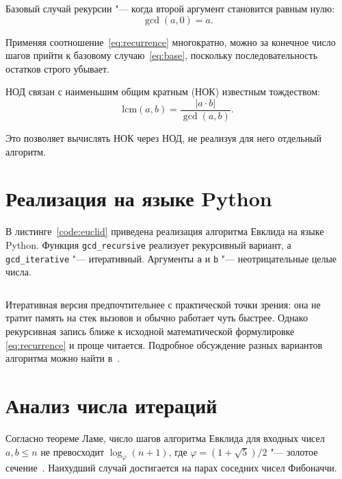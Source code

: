 \documentclass[coursework]{SCWorks}
\begin{document}
Базовый случай рекурсии "--- когда второй аргумент становится равным нулю:
\begin{equation}\label{eq:base}
    \gcd(a, 0) = a.
\end{equation}

Применяя соотношение~\eqref{eq:recurrence} многократно, можно за конечное
число шагов прийти к базовому случаю~\eqref{eq:base}, поскольку
последовательность остатков строго убывает.

НОД связан с наименьшим общим кратным (НОК) известным тождеством:
\begin{equation}\label{eq:gcd-lcm}
    \mathrm{lcm}(a, b) = \dfrac{|a \cdot b|}{\gcd(a, b)}.
\end{equation}

Это позволяет вычислять НОК через НОД, не реализуя для него отдельный
алгоритм.

\section{Реализация на языке Python}

В листинге~\ref{code:euclid} приведена реализация алгоритма Евклида на
языке Python. Функция \texttt{gcd_recursive} реализует
рекурсивный вариант, а \texttt{gcd_iterative} "--- итеративный.
Аргументы \texttt{a} и \texttt{b} "--- неотрицательные целые числа.

\begin{listing}[H]
\inputminted{python}{code/euclid.py}
\caption{Реализация алгоритма Евклида на языке Python}
\label{code:euclid}
\end{listing}

Итеративная версия предпочтительнее с практической точки зрения: она не
тратит память на стек вызовов и обычно работает чуть быстрее. Однако
рекурсивная запись ближе к исходной математической формулировке~%
\eqref{eq:recurrence} и проще читается. Подробное обсуждение разных
вариантов алгоритма можно найти в~\cite{eMaxx-euclid}.

\section{Анализ числа итераций}

Согласно теореме Ламе, число шагов алгоритма Евклида для входных чисел
$a, b \leqslant n$ не превосходит $\log_\varphi(n + 1)$, где
$\varphi = (1 + \sqrt{5}) / 2$ "--- золотое сечение~\cite{knuth1997art}.
Наихудший случай достигается на парах соседних чисел Фибоначчи.
\end{document}
